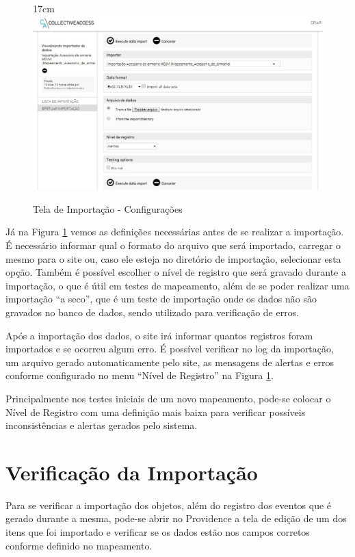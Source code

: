 \documentclass[a4paper,12pt,oneside,onecolumn,final,fleqn]{repUERJ}
\begin{document}
\begin{figure}[!ht]{17cm}
	\includegraphics[width=15cm, left]{figuras/tela_imp.jpg}
	\caption{Tela de Importação - Configurações} \label{fig:import}
\end{figure}

Já na Figura \ref{fig:import} vemos as definições necessárias antes de se realizar a importação. É necessário informar qual o formato do arquivo que será importado, carregar o mesmo para o site ou, caso ele esteja no diretório de importação, selecionar esta opção. Também é possível escolher o nível de registro que será gravado durante a importação, o que é útil em testes de mapeamento, além de se poder realizar uma importação ``a seco'', que é um teste de importação onde os dados não são gravados no banco de dados, sendo utilizado para verificação de erros.

Após a importação dos dados, o site irá informar quantos registros foram importados e se ocorreu algum erro. É possível verificar no log da importação, um arquivo gerado automaticamente pelo site, as mensagens de alertas e erros conforme configurado no menu ``Nível de Registro'' na Figura \ref{fig:import}. 

Principalmente nos testes iniciais de um novo mapeamento, pode-se colocar o Nível de Registro com uma definição mais baixa para verificar possíveis inconsistências e alertas gerados pelo sistema. 

\section{Verificação da Importação}

Para se verificar a importação dos objetos, além do registro dos eventos que é gerado durante a mesma, pode-se abrir no Providence a tela de edição de um dos itens que foi importado e verificar se os dados estão nos campos corretos conforme definido no mapeamento.
\end{document}

